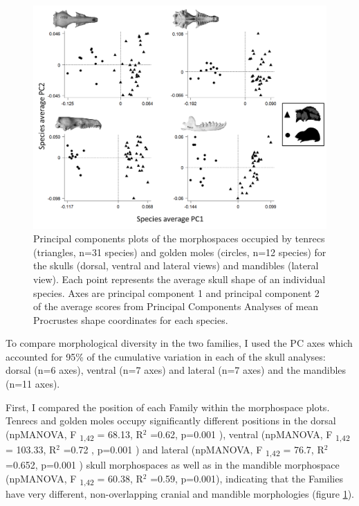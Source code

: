 	
	\begin{figure}[!htbp]
	\centering
	\includegraphics[width=1\linewidth, height=1\textheight, keepaspectratio]{Disparity/writing/figures/FourPCA_shapes.png}
	\caption[Morphospace (principal components) plot of morphological diversity in lateral views of tenrec and golden mole skulls.]
		{Principal components plots of the morphospaces occupied by tenrecs (triangles, n=31 species) and golden moles (circles, n=12 species) for the skulls (dorsal, ventral and lateral views) and mandibles (lateral view). Each point represents the average skull shape of an individual species. Axes are principal component 1 and principal component 2 of the average scores from Principal Components Analyses of mean Procrustes shape coordinates for each species.}
	\label{fig:FourPCA}
	\end{figure}

	To compare morphological diversity in the two families, I used the PC axes which accounted for 95\% of the cumulative variation in each of the skull analyses: dorsal (n=6 axes), ventral (n=7 axes) and lateral (n=7 axes) and the mandibles (n=11 axes).
	
	First, I compared the position of each Family within the morphospace plots. Tenrecs and golden moles occupy significantly different positions in the dorsal (npMANOVA, F \textsubscript{1,42} = 68.13, R$^2$ =0.62, p=0.001 ), ventral (npMANOVA, F \textsubscript{1,42} = 103.33, R$^2$ =0.72 , p=0.001 ) and lateral (npMANOVA, F \textsubscript{1,42} = 76.7, R$^2$ =0.652, p=0.001 ) skull morphospaces as well as in the mandible morphospace (npMANOVA, F \textsubscript{1,42} = 60.38, R$^2$ =0.59, p=0.001),  indicating that the Families have very different, non-overlapping cranial and mandible morphologies (figure \ref{fig:FourPCA}). 
	
